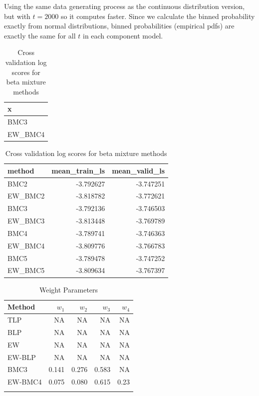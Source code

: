 \documentclass[
]{article}
\begin{document}
Using the same data generating process as the continuous distribution
version, but with \(t=2000\) so it computes faster. Since we calculate
the binned probability exactly from normal distributions, binned
probabilities (empirical pdfs) are exactly the same for all \(t\) in
each component model.

\begin{table}[H]
\caption{\label{tab:unnamed-chunk-19}Cross validation log scores for beta mixture methods}

\centering
\fontsize{8}{10}\selectfont
\begin{tabular}[t]{l}
\hline
x\\
\hline
BMC3\\
\hline
EW\_BMC4\\
\hline
\end{tabular}
\centering
\begin{tabular}[t]{l|r|r}
\hline
method & mean\_train\_ls & mean\_valid\_ls\\
\hline
BMC2 & -3.792627 & -3.747251\\
\hline
EW\_BMC2 & -3.818782 & -3.772621\\
\hline
BMC3 & -3.792136 & -3.746503\\
\hline
EW\_BMC3 & -3.813448 & -3.769789\\
\hline
BMC4 & -3.789741 & -3.746363\\
\hline
EW\_BMC4 & -3.809776 & -3.766783\\
\hline
BMC5 & -3.789478 & -3.747252\\
\hline
EW\_BMC5 & -3.809634 & -3.767397\\
\hline
\end{tabular}
\end{table}

\begin{table}[H]

\caption{\label{tab:unnamed-chunk-19}Weight Parameters}
\centering
\fontsize{8}{10}\selectfont
\begin{tabular}[t]{lrrrr}
\toprule{}
Method & $w_1$ & $w_2$ & $w_3$ & $w_4$\\
\midrule{}
TLP & NA & NA & NA & NA\\
BLP & NA & NA & NA & NA\\
EW & NA & NA & NA & NA\\
EW-BLP & NA & NA & NA & NA\\
BMC3 & 0.141 & 0.276 & 0.583 & NA\\
\addlinespace
EW-BMC4 & 0.075 & 0.080 & 0.615 & 0.23\\
\bottomrule{}
\end{tabular}
\end{table}
\end{document}
